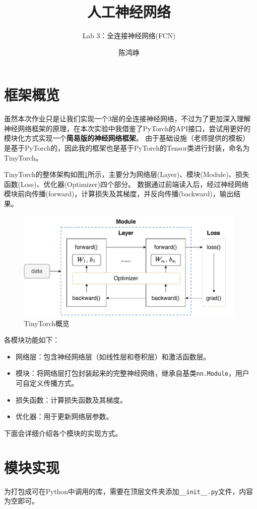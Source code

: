 \documentclass[logo,reportComp]{thesis}
\title{人工神经网络}
\subtitle{Lab 3：全连接神经网络(FCN)}
\author{陈鸿峥}
\begin{document}
\maketitle
\tableofcontents

\newpage

\section{框架概览}
虽然本次作业只是让我们实现一个3层的全连接神经网络，不过为了更加深入理解神经网络框架的原理，在本次实验中我借鉴了PyTorch的API接口，尝试用更好的模块化方式实现一个\textbf{简易版的神经网络框架}。
由于基础设施（老师提供的模板）是基于PyTorch的，因此我的框架也是基于PyTorch的Tensor类进行封装，命名为TinyTorch。

TinyTorch的整体架构如图\ref{fig:overview}所示，主要分为网络层(Layer)、模块(Module)、损失函数(Loss)、优化器(Optimizer)四个部分。
数据通过前端读入后，经过神经网络模块前向传播(forward)，计算损失及其梯度，并反向传播(backward)，输出结果。
\begin{figure}[H]
\centering
\includegraphics[width=0.8\linewidth]{fig/tinytorch.pdf}
\caption{TinyTorch概览}
\label{fig:overview}
\end{figure}

各模块功能如下：
\begin{itemize}
	\item 网络层：包含神经网络层（如线性层和卷积层）和激活函数层。
	\item 模块：将网络层打包封装起来的完整神经网络，继承自基类\verb'nn.Module'，用户可自定义传播方式。
	\item 损失函数：计算损失函数及其梯度。
	\item 优化器：用于更新网络层参数。
\end{itemize}

下面会详细介绍各个模块的实现方式。

\section{模块实现}
为打包成可在Python中调用的库，需要在顶层文件夹添加\verb'__init__.py'文件，内容为空即可。
\end{document}
